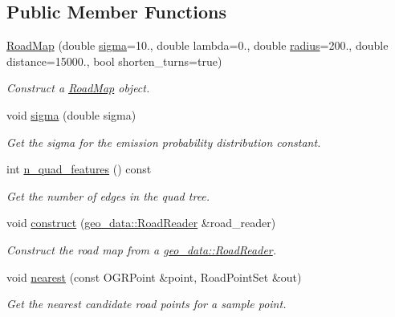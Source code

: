 \subsection*{Public Member Functions}
\begin{DoxyCompactItemize}
\item 
\hyperlink{classhmm__mm_1_1RoadMap_a047e8396e3def5299553e8d7dc32a341}{Road\+Map} (double \hyperlink{classhmm__mm_1_1RoadMap_aa469fb16711f4871f0ceea29e3dee0bd}{sigma}=10., double lambda=0., double \hyperlink{classhmm__mm_1_1RoadMap_a17ae636d51887670e192fad2cb87ce4f}{radius}=200., double distance=15000., bool shorten\+\_\+turns=true)
\begin{DoxyCompactList}\small\item\em Construct a \hyperlink{classhmm__mm_1_1RoadMap}{Road\+Map} object. \end{DoxyCompactList}\item 
void \hyperlink{classhmm__mm_1_1RoadMap_aa469fb16711f4871f0ceea29e3dee0bd}{sigma} (double sigma)
\begin{DoxyCompactList}\small\item\em Get the sigma for the emission probability distribution constant. \end{DoxyCompactList}\item 
int \hyperlink{classhmm__mm_1_1RoadMap_ab930afeeed97f3c5649eec7e7e721fd5}{n\+\_\+quad\+\_\+features} () const 
\begin{DoxyCompactList}\small\item\em Get the number of edges in the quad tree. \end{DoxyCompactList}\item 
void \hyperlink{classhmm__mm_1_1RoadMap_aa29ba9fe11cf05d2b2df95351d5ca750}{construct} (\hyperlink{classgeo__data_1_1RoadReader}{geo\+\_\+data\+::\+Road\+Reader} \&road\+\_\+reader)
\begin{DoxyCompactList}\small\item\em Construct the road map from a \hyperlink{classgeo__data_1_1RoadReader}{geo\+\_\+data\+::\+Road\+Reader}. \end{DoxyCompactList}\item 
void \hyperlink{classhmm__mm_1_1RoadMap_aff049625526c933084197039f4eabe07}{nearest} (const O\+G\+R\+Point \&point, Road\+Point\+Set \&out)
\begin{DoxyCompactList}\small\item\em Get the nearest candidate road points for a sample point. \end{DoxyCompactList}\item 

\end{DoxyCompactItemize}
